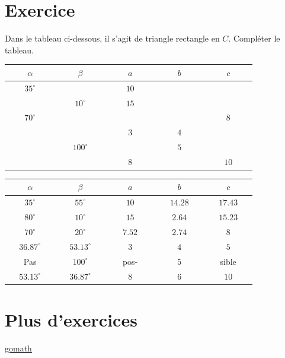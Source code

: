 \documentclass[a4paper,11pt]{article}
\begin{document}
\section{Exercice}
Dans le tableau ci-dessous, il s'agit de triangle rectangle en $C$. Compléter le tableau.
\begin{center}
\begin{tabular}{ | c | c | c | c | c | }
  \hline
 $\phantom{texte}\alpha\phantom{texte}$ & $\phantom{texte}\beta\phantom{texte}$ \phantom{texte}& $\phantom{texte}a\phantom{texte}$ & $\phantom{texte}b\phantom{texte}$ & $\phantom{texte}c\phantom{texte}$   \\
   \hline
 $35^{\circ}$ &  & $10$ &  &    \\
   \hline
  & $10^{\circ}$ & $15$ &  &    \\
   \hline
$70^{\circ}$  &  &  &  &  $8$  \\
   \hline
  &  & $3$ & $4$  &    \\
   \hline
  & $100^{\circ}$ &  & $5$ &    \\
   \hline
  &  & $8$ &  &  $10$  \\
   \hline
\end{tabular}
\end{center}

\begin{solution}
\begin{center}
\begin{tabular}{ | c | c | c | c | c | }
  \hline
 $\phantom{texte}\alpha\phantom{texte}$ & $\phantom{texte}\beta\phantom{texte}$ \phantom{texte}& $\phantom{texte}a\phantom{texte}$ & $\phantom{texte}b\phantom{texte}$ & $\phantom{texte}c\phantom{texte}$   \\
   \hline
 $35^{\circ}$ & $55^{\circ}$ & $10$ & $14.28$ & $17.43$   \\
   \hline
 $80^{\circ}$ & $10^{\circ}$ & $15$ & $2.64$ & $15.23$   \\
   \hline
$70^{\circ}$  & $20^{\circ}$ & $7.52$ & $2.74$ &  $8$  \\
   \hline
$36.87^{\circ}$  & $53.13^{\circ}$ & $3$ & $4$  & $5$   \\
   \hline
 Pas & $100^{\circ}$ & pos- & $5$ &  sible  \\
   \hline
 $53.13^{\circ}$ & $36.87^{\circ}$ & $8$ & $6$ &  $10$  \\
   \hline
\end{tabular}
\end{center}
\end{solution}

\section{Plus d'exercices}
\href{https://www.gomaths.ch/print_trigo.php?find=3&nb_calcul=10}{gomath}
\end{document}
